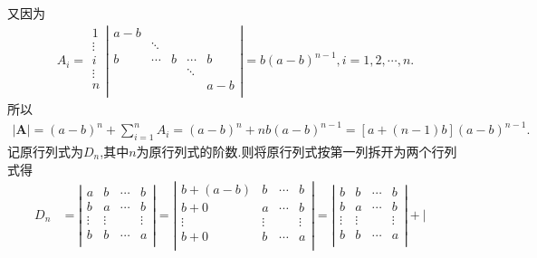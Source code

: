 \documentclass[lang=cn,newtx,10pt,scheme=chinese]{elegantbook}
\begin{document}
\begin{note}
又因为
\begin{align*}
A_i=\begin{array}{l}
1\\
\vdots\\
i\\
\vdots\\
n\\
\end{array}\left| \begin{matrix}
a-b&		&		&		&		\\
&		\ddots&		&		&		\\
b&		\cdots&		b&		\cdots&		b\\
&		&		&		\ddots&		\\
&		&		&		&		a-b\\
\end{matrix} \right|=b\left( a-b \right) ^{n-1},i=1,2,\cdots ,n. 
\end{align*}
所以
\begin{align*}
|\boldsymbol{A}|=\left( a-b \right) ^n+\sum_{i=1}^n{A_i}=\left( a-b \right) ^n+nb\left( a-b \right) ^{n-1}=\left[ a+\left( n-1 \right) b \right] \left( a-b \right) ^{n-1}.
\end{align*}
{\color{blue}}
记原行列式为$D_n$,其中$n$为原行列式的阶数.则将原行列式按第一列拆开为两个行列式得
\begin{align*}
D_n&=\left| \begin{matrix}
a&		b&		\cdots&		b\\
b&		a&		\cdots&		b\\
\vdots&		\vdots&		&		\vdots\\
b&		b&		\cdots&		a\\
\end{matrix} \right|=\left| \begin{matrix}
b+\left( a-b \right)&		b&		\cdots&		b\\
b+0&		a&		\cdots&		b\\
\vdots&		\vdots&		&		\vdots\\
b+0&		b&		\cdots&		a\\
\end{matrix} \right|=\left| \begin{matrix}
b&		b&		\cdots&		b\\
b&		a&		\cdots&		b\\
\vdots&		\vdots&		&		\vdots\\
b&		b&		\cdots&		a\\
\end{matrix} \right|+\left| \begin{matrix}

\end{matrix}
\end{align*}
\end{note}
\end{document}
